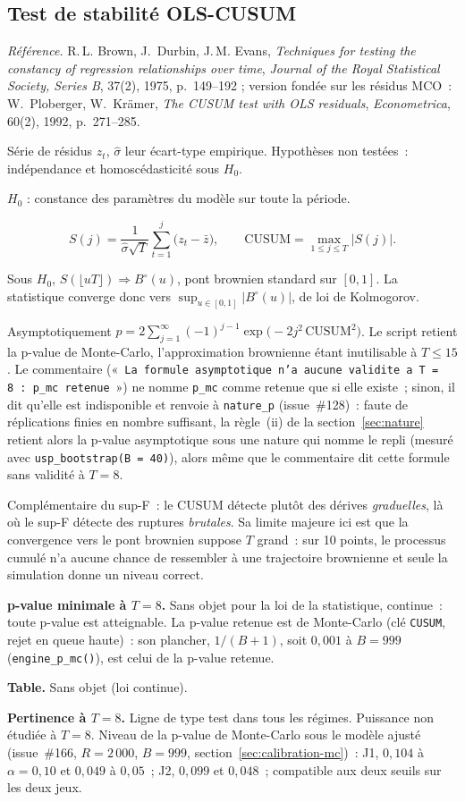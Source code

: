 \documentclass[a4paper,11pt]{article}
\newcommand{\code}[1]{\texttt{\small #1}}
\newcommand{\refl}[1]{{\small\textcolor{maincolor!70!black}{\textit{Référence.} #1}}\par\smallskip}
\newcounter{ficheid}
\newenvironment{fiche}[1]{%
  \stepcounter{ficheid}%
  \phantomsection
  \subsection{#1}%
  \label{fiche:\theficheid}%
}{%
  \end{description}\vspace{0.5em}%
}
\newcommand{\Cadre}{%
  \begin{description}[leftmargin=0pt, style=unboxed, itemsep=3pt, topsep=3pt, parsep=2pt]%
  \item[\textcolor{financeblue}{\textbf{1. Cadre, notations et hypothèses de validité (non testées).}}]}
\newcommand{\Hzero}{\item[\textcolor{financeblue}{\textbf{2. Hypothèse nulle.}}]}
\newcommand{\Stat}{\item[\textcolor{financeblue}{\textbf{3. Statistique de test.}}]}
\newcommand{\Loi}{\item[\textcolor{financeblue}{\textbf{4. Loi sous $H_0$.}}]}
\newcommand{\Pval}{\item[\textcolor{financeblue}{\textbf{5. p-value.}}]}
\newcommand{\Usage}{\item[\textcolor{financeblue}{\textbf{6. Usage et limites.}}]}
\newcommand{\Pertinence}{\item[\textcolor{financeblue}{\textbf{7. Pertinence et puissance à faible $T$.}}]}
\begin{document}
\begin{fiche}{Test de stabilité OLS-CUSUM}
\label{fiche:ols-cusum}%
\refl{R.\,L. Brown, J.~Durbin, J.\,M. Evans, \emph{Techniques for testing the constancy of
regression relationships over time}, \emph{Journal of the Royal Statistical Society, Series B},
37(2), 1975, p.~149--192 ; version fondée sur les résidus MCO~: W.~Ploberger, W.~Krämer,
\emph{The CUSUM test with OLS residuals}, \emph{Econometrica}, 60(2), 1992, p.~271--285.}
\Cadre
Série de résidus $z_t$, $\hat\sigma$ leur écart-type empirique. Hypothèses non testées~:
indépendance et homoscédasticité sous $H_0$.
\Hzero
$H_0$ : constance des paramètres du modèle sur toute la période.
\Stat
\[
  S(j) = \frac{1}{\hat\sigma\sqrt{T}}\sum_{t=1}^{j}\big(z_t - \bar z\big),
  \qquad
  \mathrm{CUSUM} = \max_{1\le j\le T}\big|S(j)\big| .
\]
\Loi
Sous $H_0$, $S(\lfloor uT \rfloor) \Rightarrow B^{\circ}(u)$, pont brownien standard sur $[0,1]$.
La statistique converge donc vers $\sup_{u\in[0,1]}|B^\circ(u)|$, de loi de Kolmogorov.
\Pval
Asymptotiquement
$p = 2\sum_{j=1}^{\infty}(-1)^{j-1}\exp\!\big(-2j^2\,\mathrm{CUSUM}^2\big)$.
Le script retient la p-value de Monte-Carlo, l'approximation brownienne étant inutilisable à
$T \le 15$. Le commentaire («~\code{La formule asymptotique n'a aucune validite a T = 8~: p\_mc
retenue}~») ne nomme \code{p\_mc} comme retenue que si elle existe~; sinon, il dit qu'elle est
indisponible et renvoie à \code{nature\_p} (issue~\#128)~: faute de réplications finies en
nombre suffisant, la règle~(ii) de la section~\ref{sec:nature} retient alors la p-value
asymptotique sous une nature qui nomme le repli (mesuré avec \code{usp\_bootstrap(B = 40)}),
alors même que le commentaire dit cette formule sans validité à $T = 8$.
\Usage
Complémentaire du sup-F~: le CUSUM détecte plutôt des dérives \emph{graduelles}, là où le sup-F
détecte des ruptures \emph{brutales}. Sa limite majeure ici est que la convergence vers le pont
brownien suppose $T$ grand~: sur 10 points, le processus cumulé n'a aucune chance de ressembler à
une trajectoire brownienne et seule la simulation donne un niveau correct.
\Pertinence
\textbf{p-value minimale à $T = 8$.} Sans objet pour la loi de la statistique, continue~: toute p-value est atteignable. La p-value retenue est de Monte-Carlo (clé \code{CUSUM}, rejet en queue haute)~: son plancher, $1/(B+1)$, soit $0{,}001$ à $B = 999$ (\code{engine\_p\_mc()}), est celui de la p-value retenue.

\textbf{Table.} Sans objet (loi continue).

\textbf{Pertinence à $T = 8$.} Ligne de type test dans tous les régimes. Puissance non étudiée à $T = 8$. Niveau de la p-value de Monte-Carlo sous le modèle ajusté (issue~\#166, $R = 2\,000$, $B = 999$, section~\ref{sec:calibration-mc})~: J1, $0{,}104$ à $\alpha = 0{,}10$ et $0{,}049$ à $0{,}05$~; J2, $0{,}099$ et $0{,}048$~; compatible aux deux seuils sur les deux jeux.


\end{fiche}
\end{document}
